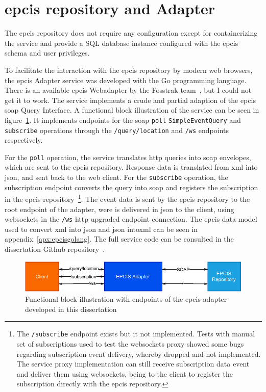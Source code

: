 \section{\acs{epcis} repository and Adapter}

The \ac{epcis} repository does not require any configuration except for containerizing the service and provide a SQL database instance configured with the \ac{epcis} schema and user privileges.

To facilitate the interaction with the \ac{epcis} repository by modern web browsers, the \ac{epcis} Adapter service was developed with the Go programming language. There is an available \ac{epcis} Webadapter by the Fosstrak team~\cite{FosstrakEPCISEPCIS}, but I could not get it to work. The service implements a crude and partial adaption of the \ac{epcis} \ac{soap} Query Interface. A functional block illustration of the service can be seen in figure~\ref{fig:epcisadapter}. It implements endpoints for the \ac{soap} \texttt{poll} \texttt{SimpleEventQuery} and \texttt{subscribe} operations through the \texttt{/query/location} and \texttt{/ws} endpoints respectively.

For the \texttt{poll} operation, the service translates \ac{http} queries into \ac{soap} envelopes, which are sent to the \ac{epcis} repository. Response data is translated from \ac{xml} into \ac{json}, and sent back to the web client. 
For the \texttt{subscribe} operation, the subscription endpoint converts the query into \ac{soap} and registers the subscription in the \ac{epcis} repository~\footnote{The \texttt{/subscribe} endpoint exists but it not implemented. Tests with manual set of subscriptions used to test the websockets proxy showed some bugs regarding subscription event delivery, whereby dropped and not implemented. The service proxy implementation can still receive subscription data event and deliver them using websockets, being to the client to register the subscription directly with the \ac{epcis} repository.}. The event data is sent by the \ac{epcis} repository to the root endpoint of the adapter, were is delivered in \ac{json} to the client, using websockets in the \texttt{/ws} \ac{http} upgraded endpoint connection.
The \ac{epcis} data model used to convert \ac{xml} into \ac{json} and \ac{json} into\ac{xml} can be seen in appendix~\ref{apx:epcisgolang}. The full service code can be consulted in the dissertation Github repository~\cite{DvcorreiaEpcsmartshelve}.

\begin{figure}
  \centering
  \includegraphics[width=\textwidth]{figs/epcis-adapter.pdf}
  \caption{Functional block illustration with endpoints of the \acs{epcis}-adapter developed in this dissertation}
  \label{fig:epcisadapter}
\end{figure}


